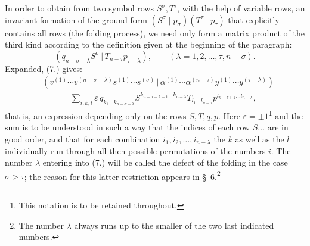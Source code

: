 \documentclass[11pt]{article}
\providecommand{\pair}[2]{(#1\,|\,#2)}
\providecommand{\eps}{\varepsilon}
\begin{document}
In order to obtain from two symbol rows $S^\sigma,T^\tau$, with the help of variable rows, an invariant formation of the ground form $(S^\sigma\mid p_\sigma)(T^\tau\mid p_\tau)$ that explicitly contains all rows (the folding process), we need only form a matrix product of the third kind according to the definition given at the beginning of the paragraph:
\begin{equation}
 \pair{q_{n-\sigma-\lambda}S^\sigma}{T_{n-\tau}p_{\tau-\lambda}},
 \qquad (\lambda=1,2,\ldots,\tau,n-\sigma).
\tag{7}
\end{equation}
Expanded, (7.) gives:
\begin{equation}
\begin{aligned}
&\pair{v^{(1)}\cdots v^{(n-\sigma-\lambda)}s^{(1)}\cdots s^{(\sigma)}}
       {\alpha^{(1)}\cdots\alpha^{(n-\tau)}y^{(1)}\cdots y^{(\tau-\lambda)}} \\
&\qquad =\sum_{i,k,l}\eps\,q_{k_1\ldots k_{n-\sigma-\lambda}}
 S^{k_{n-\sigma-\lambda+1}\ldots k_{n-\lambda}}
 T_{l_1\ldots l_{n-\tau}}
 p^{l_{n-\tau+1}\ldots l_{n-\lambda}},
\end{aligned}
\tag{8}
\end{equation}
that is, an expression depending only on the rows $S,T,q,p$. Here $\eps=\pm1$\footnote{This notation is to be retained throughout.} and the sum is to be understood in such a way that the indices of each row $S\ldots$ are in good order, and that for each combination $i_1,i_2,\ldots,i_{n-\lambda}$ the $k$ as well as the $l$ individually run through all then possible permutations of the numbers $i$. The number $\lambda$ entering into (7.) will be called the defect of the folding in the case $\sigma>\tau$; the reason for this latter restriction appears in \S\ 6.\footnote{The number $\lambda$ always runs up to the smaller of the two last indicated numbers.}
\end{document}
